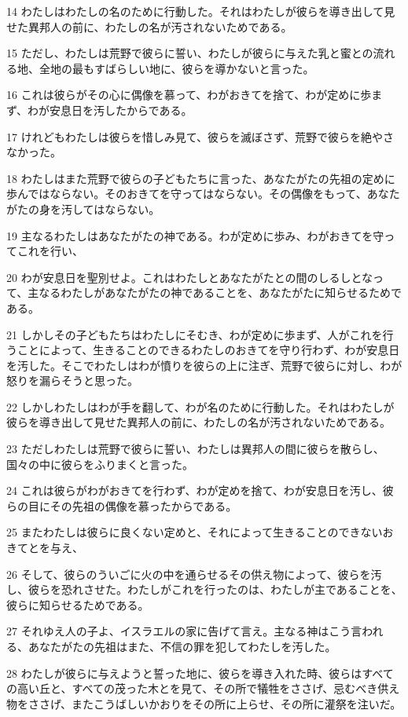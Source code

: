 \par 14 わたしはわたしの名のために行動した。それはわたしが彼らを導き出して見せた異邦人の前に、わたしの名が汚されないためである。
\par 15 ただし、わたしは荒野で彼らに誓い、わたしが彼らに与えた乳と蜜との流れる地、全地の最もすばらしい地に、彼らを導かないと言った。
\par 16 これは彼らがその心に偶像を慕って、わがおきてを捨て、わが定めに歩まず、わが安息日を汚したからである。
\par 17 けれどもわたしは彼らを惜しみ見て、彼らを滅ぼさず、荒野で彼らを絶やさなかった。
\par 18 わたしはまた荒野で彼らの子どもたちに言った、あなたがたの先祖の定めに歩んではならない。そのおきてを守ってはならない。その偶像をもって、あなたがたの身を汚してはならない。
\par 19 主なるわたしはあなたがたの神である。わが定めに歩み、わがおきてを守ってこれを行い、
\par 20 わが安息日を聖別せよ。これはわたしとあなたがたとの間のしるしとなって、主なるわたしがあなたがたの神であることを、あなたがたに知らせるためである。
\par 21 しかしその子どもたちはわたしにそむき、わが定めに歩まず、人がこれを行うことによって、生きることのできるわたしのおきてを守り行わず、わが安息日を汚した。そこでわたしはわが憤りを彼らの上に注ぎ、荒野で彼らに対し、わが怒りを漏らそうと思った。
\par 22 しかしわたしはわが手を翻して、わが名のために行動した。それはわたしが彼らを導き出して見せた異邦人の前に、わたしの名が汚されないためである。
\par 23 ただしわたしは荒野で彼らに誓い、わたしは異邦人の間に彼らを散らし、国々の中に彼らをふりまくと言った。
\par 24 これは彼らがわがおきてを行わず、わが定めを捨て、わが安息日を汚し、彼らの目にその先祖の偶像を慕ったからである。
\par 25 またわたしは彼らに良くない定めと、それによって生きることのできないおきてとを与え、
\par 26 そして、彼らのういごに火の中を通らせるその供え物によって、彼らを汚し、彼らを恐れさせた。わたしがこれを行ったのは、わたしが主であることを、彼らに知らせるためである。
\par 27 それゆえ人の子よ、イスラエルの家に告げて言え。主なる神はこう言われる、あなたがたの先祖はまた、不信の罪を犯してわたしを汚した。
\par 28 わたしが彼らに与えようと誓った地に、彼らを導き入れた時、彼らはすべての高い丘と、すべての茂った木とを見て、その所で犠牲をささげ、忌むべき供え物をささげ、またこうばしいかおりをその所に上らせ、その所に灌祭を注いだ。
